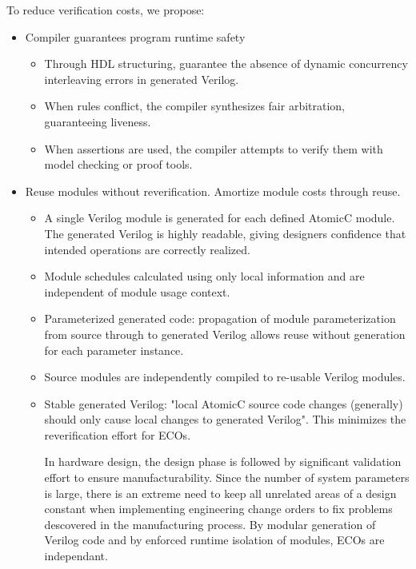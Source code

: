 To reduce verification costs, we propose:
\begin{itemize}
\item Compiler guarantees program runtime safety
\begin{itemize}
\item Through HDL structuring, guarantee the absence of dynamic concurrency interleaving errors in generated Verilog.
\item When rules conflict, the compiler synthesizes fair arbitration, guaranteeing liveness.
\item When assertions are used, the compiler attempts to verify them with model checking or proof tools.
\end{itemize}
\item Reuse modules without reverification.  Amortize module costs through reuse.
\begin{itemize}
\item A single Verilog module is generated for each defined AtomicC module.
The generated Verilog is highly readable, giving designers confidence that
intended operations are correctly realized.
\item Module schedules calculated using only local information and are independent of module usage context.
\item Parameterized generated code: propagation of module parameterization from
source through to generated Verilog allows reuse without generation for each parameter instance.
\item Source modules are independently compiled to re-usable Verilog modules.
\item Stable generated Verilog: "local AtomicC source code changes (generally) should only cause local changes to generated Verilog".
This minimizes the reverification effort for ECOs.

In hardware design, the design phase is followed by significant validation effort
to ensure manufacturability.  Since the number of system parameters is
large, there is an extreme need to keep all unrelated areas of a design constant
when implementing engineering change orders to fix problems descovered
in the manufacturing process.
By modular generation of Verilog code and by enforced runtime isolation
of modules, ECOs are independant.

\end{itemize}


\end{itemize}
